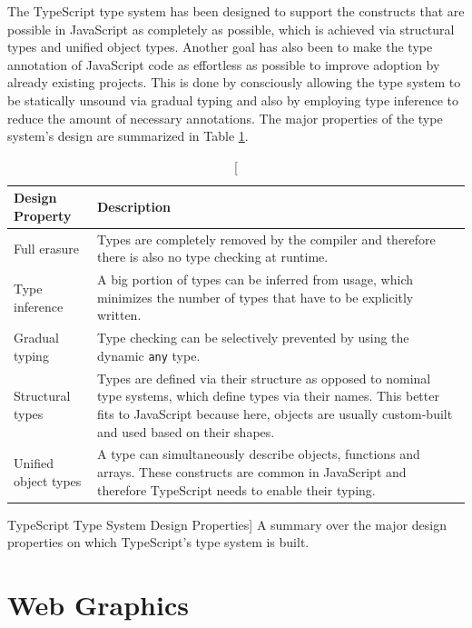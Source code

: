 The TypeScript type system has been designed to support the constructs that are possible in JavaScript as completely as possible, which is achieved via structural types and unified object types. Another goal has also been to make the type annotation of JavaScript code as effortless as possible to improve adoption by already existing projects. This is done by consciously allowing the type system to be statically unsound via gradual typing and also by employing type inference to reduce the amount of necessary annotations. The major properties of the type system's design are summarized in Table \ref{tab:TSTypeSystemDesignProperties}.

\begin{table}[tp]
\centering
\begin{tabularx}{\linewidth}{| l | X |}
\hline
\textbf{Design Property} & \textbf{Description} \\ \hline
Full erasure             & Types are completely removed by the compiler and therefore there is also no type checking at runtime. \\ \hline
Type inference           & A big portion of types can be inferred from usage, which minimizes the number of types that have to be explicitly written. \\ \hline
Gradual typing           & Type checking can be selectively prevented by using the dynamic \lstinline{any} type. \\ \hline
Structural types         & Types are defined via their structure as opposed to nominal type systems, which define types via their names. This better fits to JavaScript because here, objects are usually custom-built and used based on their shapes. \\ \hline
Unified object types     & A type can simultaneously describe objects, functions and arrays. These constructs are common in JavaScript and therefore TypeScript needs to enable their typing. \\ \hline
\end{tabularx}
\caption
  [TypeScript Type System Design Properties]
  {A summary over the major design properties on which TypeScript's type system is built. }
\label{tab:TSTypeSystemDesignProperties}
\end{table}


\section{Web Graphics}


